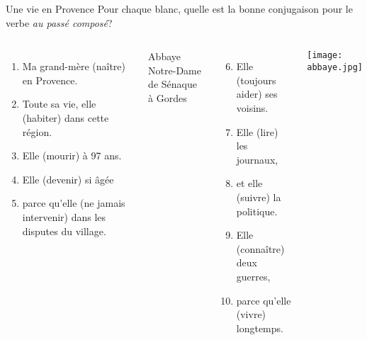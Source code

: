 \begin{frame}{Une vie en Provence}
  \small
  Pour chaque blanc, quelle est la bonne conjugaison pour le verbe \emph{au passé composé}?
  \begin{columns}[t]
    \scriptsize
      \begin{enumerate}
        \item Ma grand-mère \underline{} (naître) en Provence.
        \item Toute sa vie, elle \underline{} (habiter) dans cette région.
        \item Elle \underline{} (mourir) à 97 ans.
        \item Elle \underline{} (devenir) si âgée
        \item parce qu'elle \underline{} (ne jamais intervenir) dans les disputes du village.
      \end{enumerate}
      \vspace{0.2cm}
      \begin{flushright}
      Abbaye Notre-Dame de Sénaque \\
      à Gordes
      \end{flushright}
      \begin{enumerate}
        \setcounter{enumi}{5}
        \item Elle \underline{} (toujours aider) ses voisins.
        \item Elle \underline{} (lire) les journaux,
        \item et elle \underline{} (suivre) la politique.
        \item Elle \underline{} (connaître) deux guerres,
        \item parce qu'elle \underline{} (vivre) longtemps.
      \end{enumerate}
      \texttt{[image: abbaye.jpg]}
  \end{columns}
\end{frame}